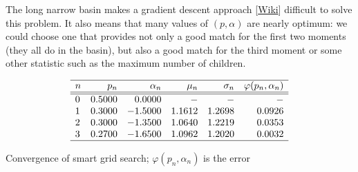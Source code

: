 \documentclass[oneside,10pt]{book}
\begin{document}
The long narrow basin makes a
\textcolor{index}{gradient descent} approach [\href{https://en.wikipedia.org/wiki/Gradient_descent}{Wiki}]
  difficult
 to solve this problem. It also means that many values of $(p,\alpha)$ are nearly optimum: we could choose one
 that provides not only a good match for the first two moments (they all do in the basin), but also a good match for the third moment or some other
 statistic such as the maximum number of children.

\begin{table}[H]
\[
\begin{array}{lrrrrr}
\hline
n	& p_n& \alpha_n	& \mu_n&	\sigma_n & \varphi(p_n,\alpha_n)\\
\hline
\hline
0 & 0.5000 & 0.0000 & -  & - & - \\
 1 & 0.3000 & -1.5000 &  1.1612 &  1.2698 & 0.0926\\
2 & 0.3000 & -1.3500 &   1.0640 & 1.2219 & 0.0353\\
3  & 0.2700 & -1. 6500 &  1.0962 & 1.2020 & 0.0032\\
\hline
\end{array}
\]
\caption{\label{tablerone} Convergence of smart grid search; $\varphi(p_n,\alpha_n)$ is the error}
\end{table}
\end{document}
